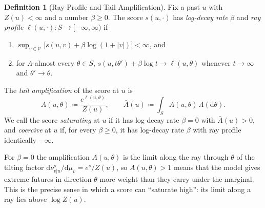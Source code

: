 \documentclass[11pt]{article}
\theoremstyle{plain}
\theoremstyle{definition}
\newtheorem{definition}[theorem]{Definition}
\theoremstyle{remark}
\newcommand{\VV}{\mathcal{V}}
\newcommand{\Dd}{\mathrm{d}}
\newcommand{\define}{\coloneqq}
\newcommand{\abs}[1]{\left\lvert #1 \right\rvert}
\begin{document}
\begin{definition}[Ray Profile and Tail Amplification]
 \label{def:profile}
 Fix a past $u$ with $Z(u)<\infty$ and a number $\beta\ge0$. The score
 $s(u,\cdot)$ has \emph{log-decay rate} $\beta$ and \emph{ray profile}
 $\ell(u,\cdot):S\to[-\infty,\infty)$ if
 \begin{enumerate}[label=(R\arabic*)]
  \item \label{R1} $\sup_{v\in\VV}\bigl[s(u,v)+\beta\log(1+\abs{v})\bigr]<\infty$, and
  \item \label{R2} for $\Lambda$-almost every $\theta\in S$,
        $s(u,t\theta')+\beta\log t\to\ell(u,\theta)$ whenever $t\to\infty$
        and $\theta'\to\theta$.
 \end{enumerate}
 The \emph{tail amplification} of the score at $u$ is
 \begin{equation}
  A(u,\theta)\define\frac{e^{\ell(u,\theta)}}{Z(u)},\qquad
  \bar A(u)\define\int_{S}A(u,\theta)\,\Lambda(\Dd\theta).
  \label{eq:amplification}
 \end{equation}
 We call the score \emph{saturating} at $u$ if it has log-decay rate $\beta=0$
 with $\bar A(u)>0$, and \emph{coercive} at $u$ if, for every $\beta\ge0$, it
 has log-decay rate $\beta$ with ray profile identically $-\infty$.
\end{definition}

For $\beta=0$ the amplification $A(u,\theta)$ is the limit along the ray
through $\theta$ of the tilting factor $\Dd\nu^{s}_{v\vert u}/\Dd\mu_v=e^{s}/Z(u)$,
so $A(u,\theta)>1$ means that the model gives extreme futures in direction
$\theta$ more weight than they carry under the marginal. This is the precise
sense in which a score can ``saturate high'': its limit along a ray lies above
$\log Z(u)$.
\end{document}

